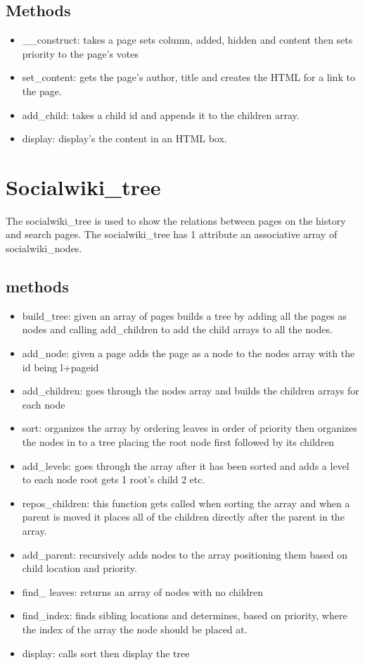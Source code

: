 \documentclass[letterpaper,twoside,11pt]{article}
\begin{document}
\subsection{Methods}
	\begin{itemize}
		\item \_\_construct: takes a page sets column, added, hidden and content then sets priority to the page's votes
		\item set\_content: gets the page's author, title and creates the HTML for a link to the page.
		\item add\_child: takes a child id and appends it to the children array.
		\item display: display's the content in an HTML box.
	\end{itemize}



\section{Socialwiki\_tree}
The socialwiki\_tree is used to show the relations between pages on the history and search pages.
The socialwiki\_tree has 1 attribute an associative array of socialwiki\_nodes.
	\subsection{methods}
		\begin{itemize}
			\item build\_tree: given an array of pages builds a tree by adding all the pages as nodes and calling add\_children to add the child arrays to all the nodes.
			\item add\_node: given a page adds the page as a node to the nodes array with the id being l+pageid
			\item add\_children: goes through the nodes array and builds the children arrays for each node
			\item sort: organizes the array by ordering leaves in order of priority then organizes the nodes in to a tree placing the root node first followed by its children
			\item add\_levels: goes through the array after it has been sorted and adds a level to each node root gets 1 root's child 2 etc.
			\item repos\_children: this function gets called when sorting the array and when a parent is moved it places all of the children directly after the parent in the array.
			\item add\_parent: recursively adds nodes to the array positioning them based on child location and priority.
			\item find\_ leaves: returns an array of nodes with no children
			\item find\_index: finds sibling locations and determines, based on priority, where the index of the array the node should be placed at.
			\item display: calls sort then display the tree
		\end{itemize}
\end{document}

